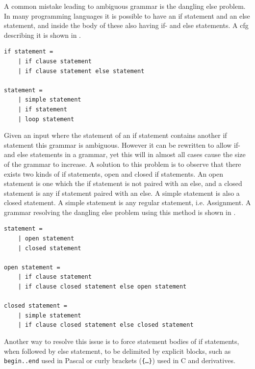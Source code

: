 A common mistake leading to ambiguous grammar is the dangling else problem. \citep{danglingelse}
In many programming languages it is possible to have an if statement and an else statement, and inside the body of these also having if- and else statements. 
A \acrshort{cfg} describing it is shown in .

\begin{lstlisting}[caption={An example of a \acrshort{cfg} describing an if statement. \citep{danglingelse}},frame=tlrb,label={lst:danglingelseex1},numbers=none]
if statement =
    | if clause statement
    | if clause statement else statement

statement =
    | simple statement
    | if statement
    | loop statement
\end{lstlisting}

Given an input where the statement of an if statement contains another if statement this grammar is ambiguous.  
However it can be rewritten to allow if- and else statements in a grammar, yet this will in almost all cases cause the size of the grammar to increase. 
A solution to this problem is to observe that there exists two kinds of if statements, open and closed if statements.
An open statement is one which the if statement is not paired with an else, and a closed statement is any if statement paired with an else.
A simple statement is also a closed statement.
A simple statement is any regular statement, i.e. Assignment.
A grammar resolving the dangling else problem using this method is shown in .

\begin{lstlisting}[caption={An example of a \acrshort{cfg} describing an if statement, that is not ambiguous. \citep{danglingelse}},frame=tlrb,label={lst:danglingelseex2},numbers=none]
statement =
    | open statement
    | closed statement

open statement =
    | if clause statement
    | if clause closed statement else open statement

closed statement =
    | simple statement
    | if clause closed statement else closed statement
\end{lstlisting}

Another way to resolve this issue is to force statement bodies of if statements, when followed by else statement, to be delimited by explicit blocks, such as \texttt{begin..end} used in Pascal or curly brackets (\texttt{\{\ldots\}}) used in C and derivatives. 

